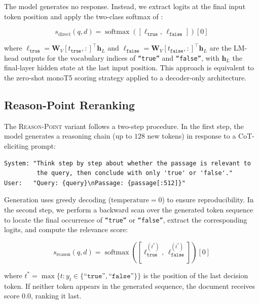\documentclass[12pt]{article}
\newcommand{\reason}{\textsc{Reason-Point}}
\newcommand{\CoT}{CoT}
\DeclareMathOperator{\softmax}{softmax}
\begin{document}
The model generates no response.  Instead, we extract logits at the final
input token position and apply the two-class softmax of :

\begin{equation}
  s_{\mathrm{direct}}(q, d) = \softmax\!\left(
    \left[\ell_{\texttt{true}},\, \ell_{\texttt{false}}\right]
  \right)[0]
\end{equation}

\noindent
where $\ell_{\texttt{true}} = \mathbf{W}_{V}[t_{\texttt{true}}, :]^\top
\mathbf{h}_{L}$ and $\ell_{\texttt{false}} = \mathbf{W}_{V}[t_{\texttt{false}}, :]^\top
\mathbf{h}_{L}$ are the LM-head outputs for the vocabulary indices of
\texttt{``true''} and \texttt{``false''}, with $\mathbf{h}_{L}$ the final-layer
hidden state at the last input position.  This approach is equivalent to the
zero-shot monoT5 scoring strategy applied to a decoder-only architecture.

\subsection{Reason-Point Reranking}
\label{sec:reason}

The \reason{} variant follows a two-step procedure.  In the first step, the
model generates a reasoning chain (up to $128$ new tokens) in response to a
\CoT{}-eliciting prompt:

\begin{lstlisting}[language={}, caption={Reason-Point prompt template.}, label={lst:reason}]
System: "Think step by step about whether the passage is relevant to
         the query, then conclude with only 'true' or 'false'."
User:   "Query: {query}\nPassage: {passage[:512]}"
\end{lstlisting}

Generation uses greedy decoding ($\text{temperature}=0$) to ensure
reproducibility.  In the second step, we perform a backward scan over the
generated token sequence to locate the final occurrence of
\texttt{``true''} or \texttt{``false''}, extract the corresponding logits,
and compute the relevance score:

\begin{equation}
  s_{\mathrm{reason}}(q, d) = \softmax\!\left(
    \left[\ell_{\texttt{true}}^{(t^*)},\, \ell_{\texttt{false}}^{(t^*)}\right]
  \right)[0]
\end{equation}

\noindent
where $t^* = \max\{t : y_t \in \{\texttt{``true''}, \texttt{``false''}\}\}$
is the position of the last decision token.  If neither token appears in the
generated sequence, the document receives score $0.0$, ranking it last.
\end{document}
